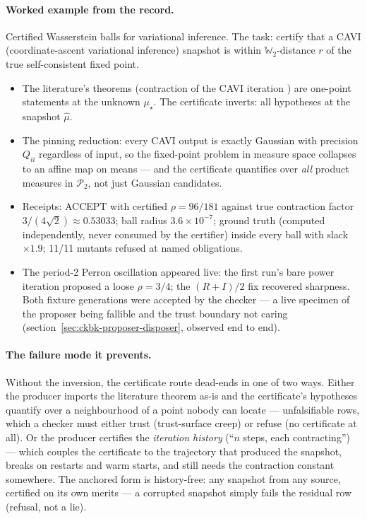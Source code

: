 \paragraph{Worked example from the record.} Certified Wasserstein
balls for variational inference. The task: certify that a CAVI
(coordinate-ascent variational inference) snapshot is within
$\mathbb{W}_2$-distance $r$ of the true self-consistent fixed point.

\begin{itemize}
\item The literature's theorems (contraction of the CAVI iteration
  \cite{caprio26}) are one-point statements at the unknown
  $\mu_\star$. The certificate
  inverts: all hypotheses at the snapshot $\hat\mu$.
\item The pinning reduction: every CAVI output is exactly Gaussian
  with precision $Q_{ii}$ regardless of input, so the fixed-point
  problem in measure space collapses to an affine map on means --- and
  the certificate quantifies over \emph{all} product measures in
  $\mathcal{P}_2$, not just Gaussian candidates.
\item Receipts: ACCEPT with certified $\rho = 96/181$ against true
  contraction factor $3/(4\sqrt{2}) \approx 0.53033$; ball radius
  $3.6 \times 10^{-7}$; ground truth (computed independently, never
  consumed by the certifier) inside every ball with slack
  ${\times}1.9$; 11/11 mutants refused at named obligations.
\item The period-2 Perron oscillation appeared live: the first run's
  bare power iteration proposed a loose $\rho = 3/4$; the $(R+I)/2$
  fix recovered sharpness. Both fixture generations were accepted by
  the checker --- a live specimen of the proposer being fallible and
  the trust boundary not caring
  (section~\ref{sec:ckbk-proposer-disposer}, observed end to end).
\end{itemize}

\paragraph{The failure mode it prevents.} Without the inversion, the
certificate route dead-ends in one of two ways. Either the producer
imports the literature theorem as-is and the certificate's hypotheses
quantify over a neighbourhood of a point nobody can locate ---
unfalsifiable rows, which a checker must either trust (trust-surface
creep) or refuse (no certificate at all). Or the producer certifies
the \emph{iteration history} (``$n$ steps, each contracting'') ---
which couples the certificate to the trajectory that produced the
snapshot, breaks on restarts and warm starts, and still needs the
contraction constant somewhere. The anchored form is history-free: any
snapshot from any source, certified on its own merits --- a corrupted
snapshot simply fails the residual row (refusal, not a lie).


